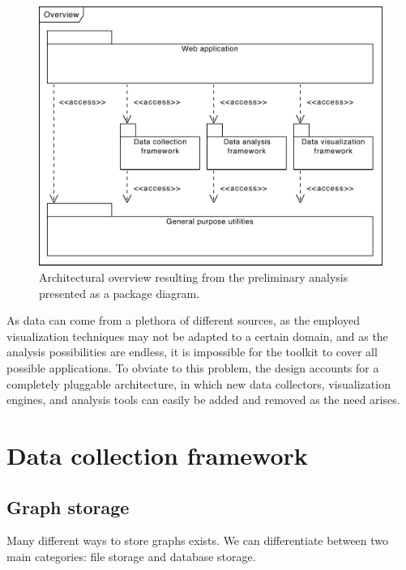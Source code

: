 \begin{figure}
    \centering
	\includegraphics[width=.7\linewidth]{images/simple-overview}
	\caption[Architectural overview of the CSAT software suite.]{Architectural overview resulting from the preliminary analysis presented as a package diagram.}
	\label{fig:simple-overview}
\end{figure}

As data can come from a plethora of different sources, as the employed visualization techniques may not be adapted to a certain domain, and as the analysis possibilities are endless, it is impossible for the toolkit to cover all possible applications. To obviate to this problem, the design accounts for a completely pluggable architecture, in which new data collectors, visualization engines, and analysis tools can easily be added and removed as the need arises.


\section{Data collection framework}

\subsection{Graph storage} 

Many different ways to store graphs exists. We can differentiate between two main categories: file storage and database storage.

